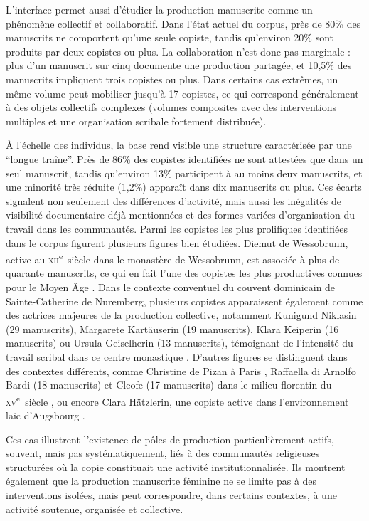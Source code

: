 \documentclass[final, fra]{anthology-ch}      %
\begin{document}
L’interface permet aussi d’étudier la production manuscrite comme un phénomène collectif et collaboratif. Dans l’état actuel du corpus, près de 80\% des manuscrits ne comportent qu’une seule copiste, tandis qu’environ 20\% sont produits par deux copistes ou plus. La collaboration n’est donc pas marginale : plus d’un manuscrit sur cinq documente une production partagée, et 10,5\% des manuscrits impliquent trois copistes ou plus. Dans certains cas extrêmes, un même volume peut mobiliser jusqu’à 17 copistes, ce qui correspond généralement à des objets collectifs complexes (volumes composites avec des interventions multiples et une organisation scribale fortement distribuée). 

À l’échelle des individus, la base rend visible une structure caractérisée par une “longue traîne”. Près de 86\% des copistes identifiées ne sont attestées que dans un seul manuscrit, tandis qu’environ 13\% participent à au moins deux manuscrits, et une minorité très réduite (1,2\%) apparaît dans dix manuscrits ou plus. Ces écarts signalent non seulement des différences d’activité, mais aussi les inégalités de visibilité documentaire déjà mentionnées et des formes variées d’organisation du travail dans les communautés. Parmi les copistes les plus prolifiques identifiées dans le corpus figurent plusieurs figures bien étudiées. Diemut de Wessobrunn, active au \textsc{xii}\textsuperscript{e}~siècle dans le monastère de Wessobrunn, est associée à plus de quarante manuscrits, ce qui en fait l’une des copistes les plus productives connues pour le Moyen Âge \cite{Beach2004WomenAsScribes}. Dans le contexte conventuel du couvent dominicain de Sainte-Catherine de Nuremberg, plusieurs copistes apparaissent également comme des actrices majeures de la production collective, notamment Kunigund Niklasin (29 manuscrits)\cite{poor_literary_2026}, Margarete Kartäuserin (19 manuscrits), Klara Keiperin (16 manuscrits) ou Ursula Geiselherin (13 manuscrits), témoignant de l’intensité du travail scribal dans ce centre monastique \cite{Willing2012KatharinaBibliothek}. D’autres figures se distinguent dans des contextes différents, comme Christine de Pizan à Paris \cite{Ouy2012AlbumChristine}, Raffaella di Arnolfo Bardi (18 manuscrits) et Cleofe (17 manuscrits) dans le milieu florentin du \textsc{xv}\textsuperscript{e}~siècle \cite{Moreton2013NunBookProduction}, ou encore Clara Hätzlerin, une copiste active dans l'environnement laïc d'Augsbourg \cite{Edmunds1999ClaraHaetzlerin}. 

Ces cas illustrent l’existence de pôles de production particulièrement actifs, souvent, mais pas systématiquement, liés à des communautés religieuses structurées où la copie constituait une activité institutionnalisée. Ils montrent également que la production manuscrite féminine ne se limite pas à des interventions isolées, mais peut correspondre, dans certains contextes, à une activité soutenue, organisée et collective.
\end{document}
